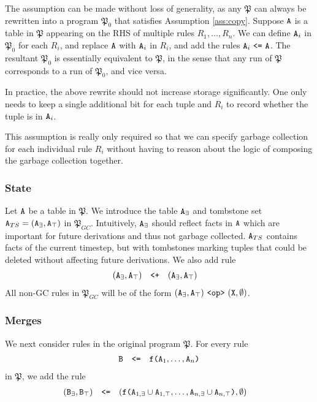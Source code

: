 \documentclass{article}
\numberwithin{equation}{section}
\renewcommand{\tt}[1]{\ifmmode\text{\texttt{#1}}\else\texttt{#1}\fi}
\begin{document}
The assumption can be made without loss of generality, as any $\mathfrak{P}$ can always be rewritten into a program $\mathfrak{P}_0$ that satisfies Assumption \ref{ass:copy}.
Suppose $\tt{A}$ is a table in $\mathfrak{P}$ appearing on the RHS of multiple rules $R_1,\dots,R_n$.
We can define $\tt{A}_i$ in $\mathfrak{P}_0$ for each $R_i$, and replace $\tt{A}$ with $\tt{A}_i$ in $R_i$, and add the rules $\tt{A}_i ~\tt{<=}~ \tt{A}$.
The resultant $\mathfrak{P}_0$ is essentially equivalent to $\mathfrak{P}$, in the sense that any run of $\mathfrak{P}$ corresponds to a run of $\mathfrak{P}_0$, and vice versa.

In practice, the above rewrite should not increase storage significantly.
One only needs to keep a single additional bit for each tuple and $R_i$ to record whether the tuple is in $\tt{A}_i$.

This assumption is really only required so that we can specify garbage collection for each individual rule $R_i$ without having to reason about the logic of composing the garbage collection together.

\subsubsection{State}
Let $\tt{A}$ be a table in $\mathfrak{P}$.
We introduce the table $\tt{A}_\exists$ and tombstone set $\tt{A}_{TS} = (\tt{A}_\exists, \tt{A}_\top)$ in $\mathfrak{P}_{GC}$.
Intuitively, $\tt{A}_\exists$ should reflect facts in $\tt{A}$ which are important for future derivations and thus not garbage collected.
$\tt{A}_{TS}$ contains facts of the current timestep, but with tombstones marking tuples that could be deleted without affecting future derivations.
We also add rule
\begin{align}
(\tt{A}_\exists, \tt{A}_\top) &\quad\tt{<+}\quad (\tt{A}_\exists, \tt{A}_\top)\label{eq:aexistmerge}
\end{align}
All non-GC rules in $\mathfrak{P}_{GC}$ will be of the form $(\tt{A}_\exists, \tt{A}_\top) ~\tt{<op>}~ (\tt{X}, \emptyset)$.


\subsubsection{Merges}
We next consider rules in the original program $\mathfrak{P}$.
For every rule
\begin{align}
\tt{B} \quad\tt{<=}\quad \tt{f(}\tt{A}_1,\dots,\tt{A}_n\tt{)}
\end{align}
in $\mathfrak{P}$, we add the rule
\begin{align*}
(\tt{B}_\exists, \tt{B}_\top) &\quad\tt{<=}\quad (\tt{f(}\tt{A}_{1,\exists} \cup \tt{A}_{1,\top},\dots,\tt{A}_{n,\exists} \cup \tt{A}_{n,\top}\tt{)}, \emptyset)
\end{align*}
\end{document}
